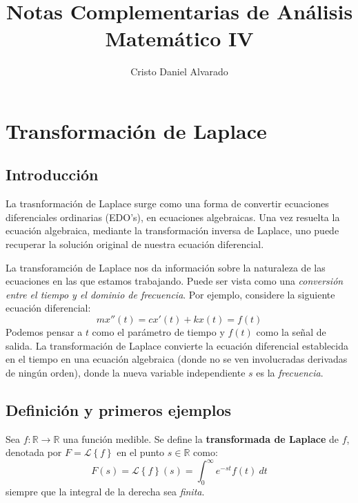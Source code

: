 \documentclass[12pt]{report}
\newcounter{it}
\theoremstyle{largebreak}
\newcommand\cf[3]{\ensuremath{#1:#2\rightarrow#3}}
\begin{document}
    \setlength{\parskip}{5pt} %
    \setlength{\parindent}{12pt} %
    \title{Notas Complementarias de Análisis Matemático IV}
    \author{Cristo Daniel Alvarado}
    \maketitle

    \tableofcontents %

    \setcounter{chapter}{4} %

    \chapter{Transformación de Laplace}

    \section{Introducción}

    La trasnformación de Laplace surge como una forma de convertir ecuaciones diferenciales ordinarias (EDO's), en ecuaciones algebraicas. Una vez resuelta la ecuación algebraica, mediante la transformación inversa de Laplace, uno puede recuperar la solución original de nuestra ecuación diferencial.

    La transforamción de Laplace nos da información sobre la naturaleza de las ecuaciones en las que estamos trabajando. Puede ser vista como una \textit{conversión entre el tiempo y el dominio de frecuencia}. Por ejemplo, considere la siguiente ecuación diferencial:
    \begin{equation*}
        mx''(t)=cx'(t)+kx(t)=f(t)
    \end{equation*}
    Podemos pensar a $t$ como el parámetro de tiempo y $f(t)$ como la señal de salida. La transformación de Laplace convierte la ecuación diferencial establecida en el tiempo en una ecuación algebraica (donde no se ven involucradas derivadas de ningún orden), donde la nueva variable independiente $s$ es la \textit{frecuencia}.

    \section{Definición y primeros ejemplos}

    \begin{mydef}
        Sea $\cf{f}{\mathbb{R}}{\mathbb{R}}$ una función medible.
        Se define la \textbf{transformada de Laplace} de $f$, denotada por $F=\mathcal{L}\left\{f\right\}$ en el punto $s\in\mathbb{R}$ como:
        \begin{equation*}
            F(s)=\mathcal{L}\left\{f\right\}(s)=\int_0^{\infty}e^{-st}f(t)\:dt
        \end{equation*}
        siempre que la integral de la derecha sea \textit{finita}.
    \end{mydef}
\end{document}
